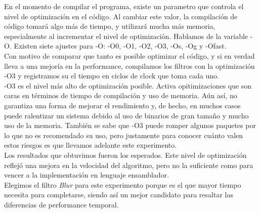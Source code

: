 \documentclass[10pt,a4paper,spanish]{article}
\begin{document}
En el momento de compilar el programa, existe un parametro que controla el nivel de optimización en el código. Al cambiar este valor, la compilación de código tomará algo más de tiempo, y utilizará mucha más memoria, especialmente al incrementar el nivel de optimización. Hablamos de la variable -O. Existen siete ajustes para -O: -O0, -O1, -O2, -O3, -Os, -Og y -Ofast. \\

Con motivo de comparar que tanto es posible optimizar el código, y si en verdad lleva a una mejoría en la performance, compilamos los filtros con la optimización -O3 y registramos su el tiempo en ciclos de clock que toma cada uno. \\

-O3 es el nivel más alto de optimización posible. Activa opitimizaciones que son caras en términos de tiempo de compilación y uso de memoria. Aún así, no garantiza una forma de mejorar el rendimiento y, de hecho, en muchos casos puede ralentizar un sistema debido al uso de binarios de gran tamaño y mucho uso de la memoria. También se sabe que -O3 puede romper algunos paquetes por lo que no es recomendado su uso, pero justamente para conocer cuánto valen estos riesgos es que llevamos adelante este experimento. \\

Los resultados que obtuvimos fueron los esperados. Este nivel de optimización reflejó una mejora en la velocidad del algoritmo, pero no la suficiente como para vencer a la implementación en lenguaje ensamblador. \\

Elegimos el filtro \textit{Blur} para este experimento porque es el que mayor tiempo necesita para completarse, siendo así un mejor candidato para resaltar las diferencias de performance temporal. \\

\end{document}
